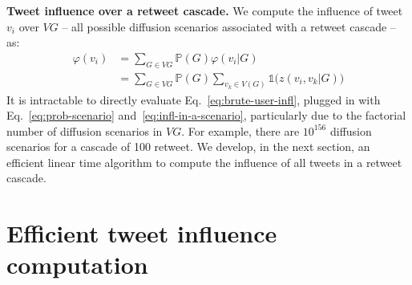 \textbf{Tweet influence over a retweet cascade.}
We compute the influence of tweet $v_i$ over $VG$ -- all possible diffusion scenarios associated with a retweet cascade -- as:
\begin{align}
	\varphi(v_i) 	&= \sum_{G\in{VG}} \mathds{P}(G) \varphi(v_i|G) \nonumber \\
				&= \sum_{G\in{VG}} \mathds{P}(G) \sum_{v_k \in V(G)} \mathds{1}\big( z(v_i,v_k|G) \big) \label{eq:brute-user-infl}
\end{align}
It is intractable to directly evaluate Eq.~\eqref{eq:brute-user-infl}, plugged in with Eq.~\eqref{eq:prob-scenario} and~\eqref{eq:infl-in-a-scenario}, particularly due to the factorial number of diffusion scenarios in $VG$.
For example, there are $10^{156}$ diffusion scenarios for a cascade of 100 retweet.
We develop, in the next section, an efficient linear time algorithm to compute the influence of all tweets in a retweet cascade.

\section{Efficient tweet influence computation}
\label{si-sec:efficient-algo}

